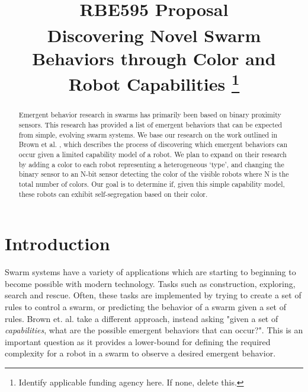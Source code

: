 \documentclass[conference]{IEEEtran}
\begin{document}
\title{RBE595 Proposal\\
{\footnotesize \textsuperscript{}Discovering Novel Swarm Behaviors through Color and Robot Capabilities
}
\thanks{Identify applicable funding agency here. If none, delete this.}
}

\author{
\and
{}
\and
{}
}

\maketitle

\begin{abstract}
Emergent behavior research in swarms has primarily been based on binary proximity sensors. This research has provided a list of emergent behaviors that can be expected from simple, evolving swarm systems. 
We base our research on the work outlined in Brown et al. \cite{c1}, which describes the process of discovering which emergent behaviors can occur given a limited capability model of a robot.
We plan to expand on their research by adding a color to each robot representing a heterogeneous `type', and changing the binary sensor to an N-bit sensor detecting the color of the visible robots where N is the total number of colors.
Our goal is to determine if, given this simple capability model, these robots can exhibit self-segregation based on their color. 

\end{abstract}

\section{Introduction}
Swarm systems have a variety of applications which are starting to beginning to become possible with modern technology. Tasks such as construction, exploring, search and rescue. 
Often, these tasks are implemented by trying to create a set of rules to control a swarm, or predicting the behavior of a swarm given a set of rules. 
Brown et. al. take a different approach, instead asking "given a set of \emph{capabilities}, what are the possible emergent behaviors that can occur?". 
This is an important question as it provides a lower-bound for defining the required complexity for a robot in a swarm to observe a desired emergent behavior. 
\end{document}

